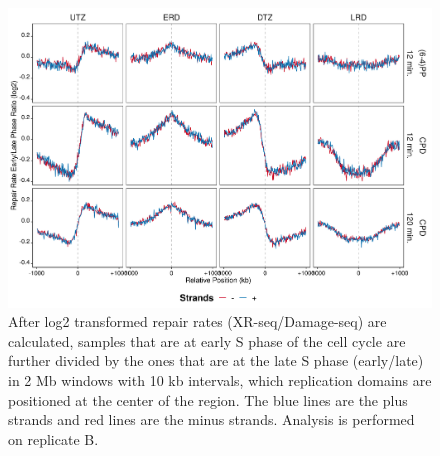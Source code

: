 \begin{figure}[H]
\begin{center}
\includegraphics[width=\textwidth]{Chapters/7_appendix/figures/supfig29}
\caption[Repair rate early/late phase ratio of replication domains in 2 Mb (replicate B).]{After log2 transformed repair rates (XR-seq/Damage-seq) are calculated, samples that are at early S phase of the cell cycle are further divided by the ones that are at the late S phase (early/late) in 2 Mb windows with 10 kb intervals, which replication domains are positioned at the center of the region. The blue lines are the plus strands and red lines are the minus strands. Analysis is performed on replicate B.}
\label{supfig:rrel2000repdomainB}
\end{center}
\end{figure}

